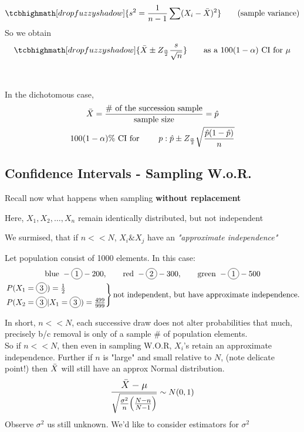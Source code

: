 \begin{gather*}
	\tcbhighmath[drop fuzzy shadow]{s^2 = \frac{1}{n-1} \sum(X_i - \bX)^2} \tag{sample variance}
\end{gather*}
So we obtain 
\begin{gather*}
	\tcbhighmath[drop fuzzy shadow]{\bX \pm Z_{\frac{\alpha}{2}} \frac{s}{\sqrt{n}}} \qquad \text{as a $100(1-\alpha)$ CI for $\mu$}
\end{gather*}
\redhline\\\\
In the dichotomous case, 
\begin{gather*}
	\bar{X} = \frac{\text{\# of the succession sample}}{\text{sample size}} = \hat{p}\\
	100(1-\alpha)\% \text{ CI for } \qquad p: \hat{p} \pm Z_{\frac{\alpha}{2}} \sqrt{\frac{\hat{p}(1-\hat{p})}{n}}
\end{gather*}
\subsection*{Confidence Intervals - Sampling W.o.R.}
Recall now what happens when sampling \textbf{without replacement}
\begin{center}
	Here, $X_1, X_2, \ldots, X_n$ remain identically distributed, but not independent
\end{center}
We surmised, that if $n << N$, $X_i \& X_j$ have an \textit{"approximate independence"}
\begin{example-N}
	Let population consist of 1000 elements. In this case:
	\begin{gather*}
		\text{blue } - \circled{1} - 200, \qquad \text{red } - \circled{2} - 300, \qquad \text{green } - \circled{1} - 500\\
		\begin{rcases}
		P(X_1 = \circled{3}) = \frac{1}{2}\\
		P(X_2 = \circled{3} | X_1 = \circled{3}) = \frac{499}{999}
		\end{rcases} \text{not independent, but have approximate independence.}
	\end{gather*}
\end{example-N}
In short, $n << N$, each successive draw does not alter probabilities that much, precisely b/c removal is only of a sample \# of population elements.\\
So if $n << N$, then even in sampling W.O.R, $X_i$'s retain an approximate independence. Further if $n$ is "large" and small relative to $N$, (note delicate point!) then $\bar{X}$ will still have an approx Normal distribution.
\begin{gather*}
	\mathlarger{\frac{\bX - \mu}{\sqrt{\frac{\sigma^2}{n} \big(\frac{N-n}{N-1} \big)}}} \sim N(0,1)
\end{gather*}
Observe $\sigma^2$ us still unknown. We'd like to consider estimators for $\sigma^2$
